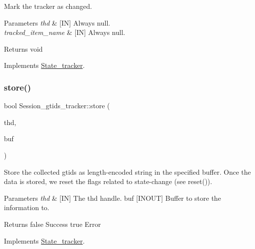 Mark the tracker as changed. 


\begin{DoxyParams}{Parameters}
{\em thd} & \mbox{[}IN\mbox{]} Always null. \\
\hline
{\em tracked\+\_\+item\+\_\+name} & \mbox{[}IN\mbox{]} Always null.\\
\hline
\end{DoxyParams}
\begin{DoxyReturn}{Returns}
void 
\end{DoxyReturn}


Implements \mbox{\hyperlink{classState__tracker_afb865d3837c0f8fc9cd36d5234142b32}{State\+\_\+tracker}}.

\mbox{\label{classSession__gtids__tracker_a35a83c4f0631294a76d707c20d5f1e1f}} 
\subsubsection{\texorpdfstring{store()}{store()}}
{\footnotesize\ttfamily bool Session\+\_\+gtids\+\_\+tracker\+::store (\begin{DoxyParamCaption}\item[{T\+HD $\ast$}]{thd,  }\item[{String \&}]{buf }\end{DoxyParamCaption})\hspace{0.3cm}{\ttfamily [virtual]}}



Store the collected gtids as length-\/encoded string in the specified buffer. Once the data is stored, we reset the flags related to state-\/change (see reset()). 


\begin{DoxyParams}{Parameters}
{\em thd} & \mbox{[}IN\mbox{]} The thd handle.  buf \mbox{[}I\+N\+O\+UT\mbox{]} Buffer to store the information to.\\
\hline
\end{DoxyParams}
\begin{DoxyReturn}{Returns}
false Success true Error 
\end{DoxyReturn}


Implements \mbox{\hyperlink{classState__tracker_aee5cd5c5ed19fbd4c8ac01dbd62471e7}{State\+\_\+tracker}}.

